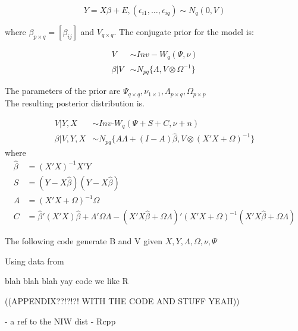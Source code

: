 \documentclass[english]{report}
\begin{document}
\[Y = X\beta + E, (\epsilon_{i1},\hdots,\epsilon_{i q})\sim N_q(0,V)\]

where $\beta_{p\times q} = [\beta_{ij}] $ and $V_{q\times q}$. The conjugate prior for the model is:

\begin{align*}
	V &\sim  Inv-W_q(\Psi,\nu)\\
	\beta|V &\sim N_{pq}\{\Lambda, V  \otimes \Omega^{-1}\}
\end{align*}

The parameters of the prior are $\Psi_{q\times q}, \nu_{1\times 1}, \Lambda_{p\times q}, \Omega_{p\times p}$\\

The resulting posterior distribution is.


\begin{align*}
	V|Y,X &\sim  Inv\text{-}W_q(\Psi+S+C,\nu+n)\\
	\beta|V,Y,X &\sim N_{pq}\{A\Lambda + (I-A)\hat{\beta}, V  \otimes (X'X +\Omega)^{-1}\}
\end{align*}
where 
\begin{align*}
\hat{\beta} &= (X'X)^{-1}X'Y\\
S &= (Y-X\hat{\beta})(Y-X\hat{\beta})\\ 
A &= (X'X + \Omega)^{-1}\Omega\\
C &= \hat{\beta}'(X'X)\hat{\beta} + \Lambda'\Omega\Lambda - (X'X\hat{\beta} + \Omega\Lambda)'(X'X+\Omega)^{-1}(X'X\hat{\beta} + \Omega\Lambda)
\end{align*}

The following code generate B and V given $X, Y, \Lambda, \Omega, \nu, \Psi$



Using data from 




blah blah blah yay code we like R

((APPENDIX??!?!?! WITH THE CODE AND STUFF YEAH))

\newpage
{}

- a ref to the NIW dist
- Rcpp
\end{document}
